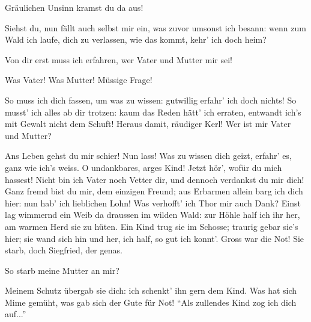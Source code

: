 \begin{drama}
\Mimespeaks


Gräulichen Unsinn
kramst du da aus!

\Siegfriedspeaks


Siehst du, nun fällt
auch selbst mir ein,
was zuvor umsonst ich besann:
wenn zum Wald ich laufe,
dich zu verlassen,
wie das kommt, kehr' ich doch heim?


Von dir erst muss ich erfahren,
wer Vater und Mutter mir sei!

\Mimespeaks


Was Vater! Was Mutter!
Müssige Frage!

\Siegfriedspeaks


So muss ich dich fassen,
um was zu wissen:
gutwillig
erfahr' ich doch nichts!
So musst' ich alles
ab dir trotzen:
kaum das Reden
hätt' ich erraten,
entwandt ich's mit Gewalt
nicht dem Schuft!
Heraus damit,
räudiger Kerl!
Wer ist mir Vater und Mutter?

\Mimespeaks


Ans Leben gehst du mir schier!
Nun lass! Was zu wissen dich geizt,
erfahr' es, ganz wie ich's weiss.
O undankbares,
arges Kind!
Jetzt hör', wofür du mich hassest!
Nicht bin ich Vater
noch Vetter dir,
und dennoch verdankst du mir dich!
Ganz fremd bist du mir,
dem einzigen Freund;
aus Erbarmen allein
barg ich dich hier:
nun hab' ich lieblichen Lohn!
Was verhofft' ich Thor mir auch Dank?
Einst lag wimmernd ein Weib
da draussen im wilden Wald:
zur Höhle half ich ihr her,
am warmen Herd sie zu hüten.
Ein Kind trug sie im Schosse;
traurig gebar sie's hier;
sie wand sich hin und her,
ich half, so gut ich konnt'.
Gross war die Not! Sie starb,
doch Siegfried, der genas.

\Siegfriedspeaks


So starb meine Mutter an mir?

\Mimespeaks

Meinem Schutz übergab sie dich:
ich schenkt' ihn gern dem Kind.
Was hat sich Mime gemüht,
was gab sich der Gute für Not!
``Als zullendes Kind
zog ich dich auf...''


\end{drama}

